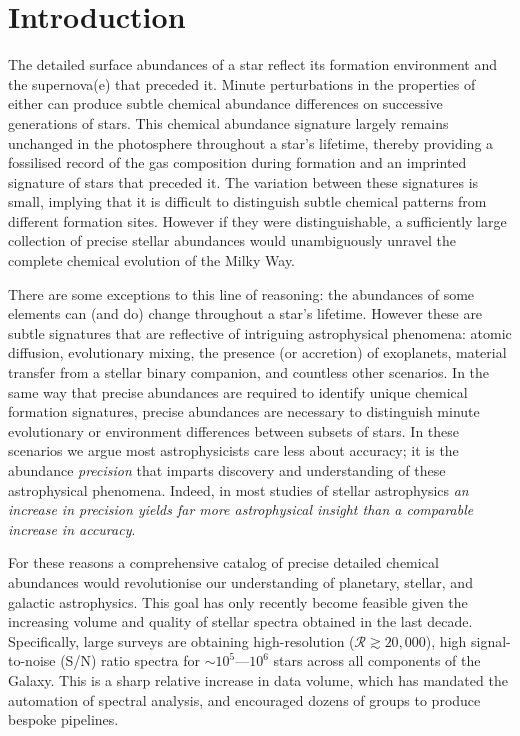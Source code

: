 \documentclass[12pt,preprint]{aastex}
\begin{document}
\section{Introduction}
The detailed surface abundances of a star reflect its formation environment and
the supernova(e) that preceded it.  Minute perturbations in the properties of 
either can produce subtle chemical abundance differences on successive
generations of stars.  This chemical abundance signature largely remains 
unchanged in the photosphere throughout a star's lifetime, thereby providing a 
fossilised record of the gas composition during formation and an imprinted 
signature of stars that preceded it.  The variation between these signatures is 
small, implying that it is difficult to distinguish subtle chemical patterns 
from different formation sites.  However if they were distinguishable, a 
sufficiently large collection of precise stellar abundances would unambiguously
unravel the complete chemical evolution of the Milky Way.


There are some exceptions to this line of reasoning: the abundances of some
elements can (and do) change throughout a star's lifetime.  However these are
subtle signatures that are reflective of intriguing astrophysical phenomena:
atomic diffusion, evolutionary mixing, the presence (or accretion) of 
exoplanets, material transfer from a stellar binary companion, and countless
other scenarios.  In the same way that precise abundances are required to 
identify unique chemical formation signatures, precise abundances are necessary
to distinguish minute evolutionary or environment differences between subsets of
stars.  In these scenarios we argue most astrophysicists care less about
accuracy; it is the abundance \emph{precision} that imparts discovery and 
understanding of these astrophysical phenomena.  Indeed, in most studies of 
stellar astrophysics \textit{an increase in precision yields far more 
astrophysical insight than a comparable increase in accuracy}.


For these reasons a comprehensive catalog of precise detailed chemical 
abundances would revolutionise our understanding of planetary, stellar, and 
galactic astrophysics.  This goal has only recently become feasible given the 
increasing volume and quality of stellar spectra obtained in the last decade.  
Specifically, large surveys are obtaining high-resolution 
($\mathcal{R} \gtrsim 20,000$), high signal-to-noise (S/N) ratio spectra for
$\sim10^5$---$10^6$ stars across all components of the Galaxy.  This is a sharp
relative increase in data volume, which has mandated the automation of spectral
analysis, and encouraged dozens of groups to produce bespoke pipelines.
\end{document}
